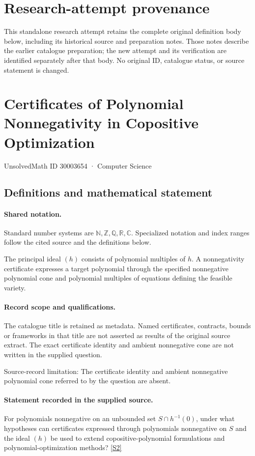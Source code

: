 \documentclass[11pt]{article}
\begin{document}
\section*{Research-attempt provenance}
This standalone research attempt retains the complete original definition body below,
including its historical source and preparation notes. Those notes describe the
earlier catalogue preparation; the new attempt and its verification are identified
separately after that body. No original ID, catalogue status, or source statement is changed.

\section{Certificates of Polynomial Nonnegativity in Copositive Optimization}\label{30003654}
{\small UnsolvedMath ID 30003654 · Computer Science}
\subsection{Definitions and mathematical statement}

\paragraph{Shared notation.}Standard number systems are $\mathbb N,\mathbb Z,\mathbb Q,\mathbb R,\mathbb C$. Specialized notation and index ranges follow the cited source and the definitions below.


The principal ideal $(h)$ consists of polynomial multiples of $h$. A nonnegativity certificate expresses a target polynomial through the specified nonnegative polynomial cone and polynomial multiples of equations defining the feasible variety.
\paragraph{Record scope and qualifications.}
The catalogue title is retained as metadata. Named certificates, contracts, bounds or frameworks in that title are not asserted as results of the original source extract.
The exact certificate identity and ambient nonnegative cone are not written in the supplied question.

Source-record limitation: The certificate identity and ambient nonnegative polynomial cone referred to by the question are absent.
\paragraph{Statement recorded in the supplied source.}
For polynomials nonnegative on an unbounded set $S\cap h^{-1}(0)$, under what hypotheses can certificates expressed through polynomials nonnegative on $S$ and the ideal $(h)$ be used to extend copositive-polynomial formulations and polynomial-optimization methods? \href{https://doi.org/10.4171/owr/2017/52}{[S2]}
\end{document}
